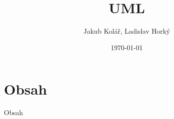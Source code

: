 


\title{UML}
\author{Jakub Kolář, Ladislav Horký}
\date{\today}



	\begin{frame}
		\titlepage
	\end{frame}
	
	\section{Obsah}
	\begin{frame}{Obsah}
		\tableofcontents
	\end{frame}



